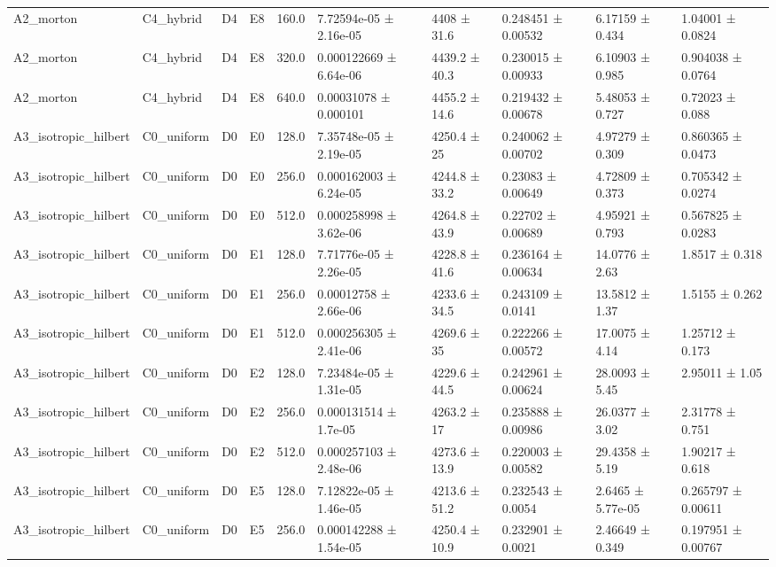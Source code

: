\begin{table}
\begin{tabular}{llllllllll}
A2\_morton & C4\_hybrid & D4 & E8 & 160.0 & 7.72594e-05 ± 2.16e-05 & 4408 ± 31.6 & 0.248451 ± 0.00532 & 6.17159 ± 0.434 & 1.04001 ± 0.0824 \\
A2\_morton & C4\_hybrid & D4 & E8 & 320.0 & 0.000122669 ± 6.64e-06 & 4439.2 ± 40.3 & 0.230015 ± 0.00933 & 6.10903 ± 0.985 & 0.904038 ± 0.0764 \\
A2\_morton & C4\_hybrid & D4 & E8 & 640.0 & 0.00031078 ± 0.000101 & 4455.2 ± 14.6 & 0.219432 ± 0.00678 & 5.48053 ± 0.727 & 0.72023 ± 0.088 \\
A3\_isotropic\_hilbert & C0\_uniform & D0 & E0 & 128.0 & 7.35748e-05 ± 2.19e-05 & 4250.4 ± 25 & 0.240062 ± 0.00702 & 4.97279 ± 0.309 & 0.860365 ± 0.0473 \\
A3\_isotropic\_hilbert & C0\_uniform & D0 & E0 & 256.0 & 0.000162003 ± 6.24e-05 & 4244.8 ± 33.2 & 0.23083 ± 0.00649 & 4.72809 ± 0.373 & 0.705342 ± 0.0274 \\
A3\_isotropic\_hilbert & C0\_uniform & D0 & E0 & 512.0 & 0.000258998 ± 3.62e-06 & 4264.8 ± 43.9 & 0.22702 ± 0.00689 & 4.95921 ± 0.793 & 0.567825 ± 0.0283 \\
A3\_isotropic\_hilbert & C0\_uniform & D0 & E1 & 128.0 & 7.71776e-05 ± 2.26e-05 & 4228.8 ± 41.6 & 0.236164 ± 0.00634 & 14.0776 ± 2.63 & 1.8517 ± 0.318 \\
A3\_isotropic\_hilbert & C0\_uniform & D0 & E1 & 256.0 & 0.00012758 ± 2.66e-06 & 4233.6 ± 34.5 & 0.243109 ± 0.0141 & 13.5812 ± 1.37 & 1.5155 ± 0.262 \\
A3\_isotropic\_hilbert & C0\_uniform & D0 & E1 & 512.0 & 0.000256305 ± 2.41e-06 & 4269.6 ± 35 & 0.222266 ± 0.00572 & 17.0075 ± 4.14 & 1.25712 ± 0.173 \\
A3\_isotropic\_hilbert & C0\_uniform & D0 & E2 & 128.0 & 7.23484e-05 ± 1.31e-05 & 4229.6 ± 44.5 & 0.242961 ± 0.00624 & 28.0093 ± 5.45 & 2.95011 ± 1.05 \\
A3\_isotropic\_hilbert & C0\_uniform & D0 & E2 & 256.0 & 0.000131514 ± 1.7e-05 & 4263.2 ± 17 & 0.235888 ± 0.00986 & 26.0377 ± 3.02 & 2.31778 ± 0.751 \\
A3\_isotropic\_hilbert & C0\_uniform & D0 & E2 & 512.0 & 0.000257103 ± 2.48e-06 & 4273.6 ± 13.9 & 0.220003 ± 0.00582 & 29.4358 ± 5.19 & 1.90217 ± 0.618 \\
A3\_isotropic\_hilbert & C0\_uniform & D0 & E5 & 128.0 & 7.12822e-05 ± 1.46e-05 & 4213.6 ± 51.2 & 0.232543 ± 0.0054 & 2.6465 ± 5.77e-05 & 0.265797 ± 0.00611 \\
A3\_isotropic\_hilbert & C0\_uniform & D0 & E5 & 256.0 & 0.000142288 ± 1.54e-05 & 4250.4 ± 10.9 & 0.232901 ± 0.0021 & 2.46649 ± 0.349 & 0.197951 ± 0.00767 \\

\end{tabular}
\end{table}
